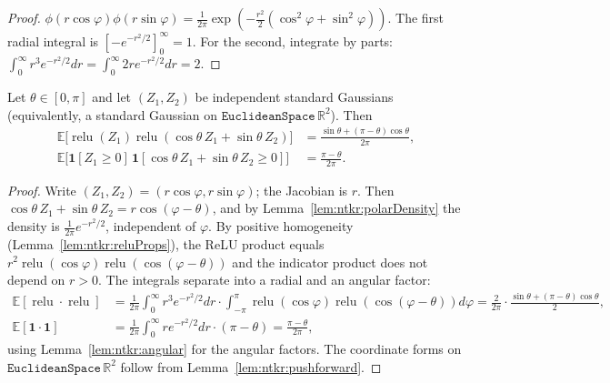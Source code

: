 \begin{proof}
  \leanok
$\phi(r\cos\varphi)\phi(r\sin\varphi)=\frac1{2\pi}\exp(-\frac{r^2}2(\cos^2\varphi+\sin^2\varphi))$. The first radial integral is
$[-e^{-r^2/2}]_0^\infty=1$. For the second, integrate by parts: $\int_0^\infty r^3e^{-r^2/2}dr=\int_0^\infty2re^{-r^2/2}dr=2$.
\end{proof}

\begin{proposition}\label{prop:ntkr:angleIntegrals}
  \leanok
Let $\theta\in[0,\pi]$ and let $(Z_1,Z_2)$ be independent standard Gaussians (equivalently, a
standard Gaussian on $\texttt{EuclideanSpace}\,\mathbb R^2$). Then
\begin{align*}
  \mathbb E\bigl[\operatorname{relu}(Z_1)\operatorname{relu}(\cos\theta\,Z_1+\sin\theta\,Z_2)\bigr]
    &=\frac{\sin\theta+(\pi-\theta)\cos\theta}{2\pi},\\
  \mathbb E\bigl[\mathbf 1[Z_1\ge0]\,\mathbf 1[\cos\theta\,Z_1+\sin\theta\,Z_2\ge0]\bigr]
    &=\frac{\pi-\theta}{2\pi}.
\end{align*}
\end{proposition}

\begin{proof}
  \leanok
Write $(Z_1,Z_2)=(r\cos\varphi,r\sin\varphi)$; the Jacobian is $r$. Then
$\cos\theta\,Z_1+\sin\theta\,Z_2=r\cos(\varphi-\theta)$, and by Lemma~\ref{lem:ntkr:polarDensity}
the density is $\frac1{2\pi}e^{-r^2/2}$, independent of $\varphi$. By positive homogeneity
(Lemma~\ref{lem:ntkr:reluProps}), the ReLU product equals $r^2\operatorname{relu}(\cos\varphi)\operatorname{relu}(\cos(\varphi-\theta))$ and the
indicator product does not depend on $r>0$. The integrals separate into a radial and an angular factor:
\begin{align*}
  \mathbb E[\operatorname{relu}\cdot\operatorname{relu}]
    &=\frac1{2\pi}\int_0^\infty r^3e^{-r^2/2}dr\cdot\int_{-\pi}^{\pi}\operatorname{relu}(\cos\varphi)\operatorname{relu}(\cos(\varphi-\theta))d\varphi
     =\frac{2}{2\pi}\cdot\frac{\sin\theta+(\pi-\theta)\cos\theta}{2},\\
  \mathbb E[\mathbf 1\cdot\mathbf 1]
    &=\frac1{2\pi}\int_0^\infty re^{-r^2/2}dr\cdot(\pi-\theta)=\frac{\pi-\theta}{2\pi},
\end{align*}
using Lemma~\ref{lem:ntkr:angular} for the angular factors. The coordinate forms on
$\texttt{EuclideanSpace}\,\mathbb R^2$ follow from Lemma~\ref{lem:ntkr:pushforward}.
\end{proof}


